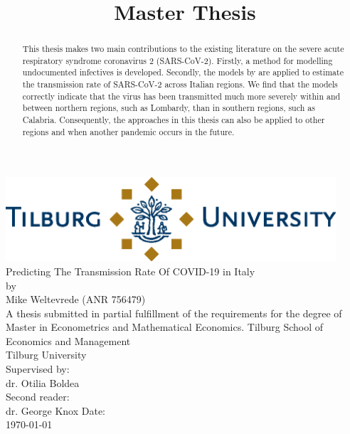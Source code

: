 \documentclass[12pt]{article}
\title{Master Thesis}
\newcommand\blankpage{
	\null
	\thispagestyle{empty}
	\addtocounter{page}{-1}
	\newpage}
\begin{document}
	
	\afterpage{\blankpage}
	
	\begin{titlepage}
		\centering
		
		\vfill
		
		\includegraphics[width=0.92\textwidth]{output/TiuLogo.eps}
		\vskip1.5cm
		{\huge
			Predicting The Transmission Rate Of COVID-19 in Italy\\
			\large\bigskip
			by\\
			Mike Weltevrede (ANR 756479)\\
			\vskip1.5cm
			A thesis submitted in partial fulfillment of the requirements for the degree of Master in Econometrics and Mathematical Economics.
			\vskip0.5cm
			Tilburg School of Economics and Management\\
			Tilburg University\\
			\vskip1.5cm
			Supervised by:\\
			dr. Otilia Boldea \\
			\vskip0.5cm
			Second reader:\\
			dr. George Knox
			\vfill
			Date:\\
			\today
		}   
		\vfill
		\vfill
	\end{titlepage}
	
	\newpage
	
	\newpage
	
	\begin{abstract}
		This thesis makes two main contributions to the existing literature on the severe acute respiratory syndrome coronavirus 2 (SARS-CoV-2). Firstly, a method for modelling undocumented infectives is developed. Secondly, the models by \textcite{adda2016economic} are applied to estimate the transmission rate of SARS-CoV-2 across Italian regions. We find that the models correctly indicate that the virus has been transmitted much more severely within and between northern regions, such as Lombardy, than in southern regions, such as Calabria. Consequently, the approaches in this thesis can also be applied to other regions and when another pandemic occurs in the future.
	\end{abstract}
	
\end{document}
